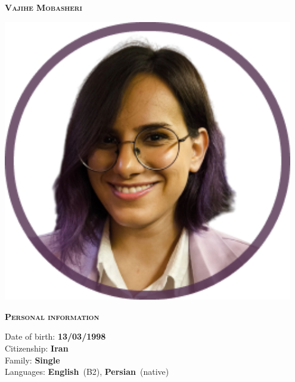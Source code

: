 \documentclass[11pt, a4paper]{article}
\newcommand{\headleft}[1]{\vspace*{3ex}\textsc{\textbf{#1}}\par%
    \vspace*{-1.5ex}\hrulefill\par\vspace*{0.7ex}}
\begin{document}
\setlength{\topskip}{0pt}
\setlength{\parindent}{0pt}
\setlength{\parskip}{0pt}
\setlength{\fboxsep}{0pt}
\pagestyle{empty}
\raggedbottom

\begin{minipage}[t]{0.33\textwidth} %
\colorbox{pink}{\begin{minipage}[t][5mm][t]{\textwidth}\null\hfill\null\end{minipage}}

\vspace{-.2ex} %
\colorbox{pink!60}{\color{black}  %
\textwidth\relax%
\begin{minipage}[t][293mm][t]{0.82\textwidth}
\raggedright
\vspace*{2ex}

\textbf{\textsc{Vajihe Mobasheri}} \largesize 

\null\hfill\includegraphics[width=0.95\textwidth]{photo2.png}\hfill\null

\vspace*{1ex} %

\headleft{Personal information}
Date of birth: \textbf{13/03/1998} \\[0.5ex]
Citizenship: \textbf{Iran} \\[0.5ex]
Family: \textbf{Single} \\[0.5ex]
Languages: \textbf{English}~(B2), \textbf{Persian}~(native)


\end{minipage}}
\end{minipage}
\end{document}

